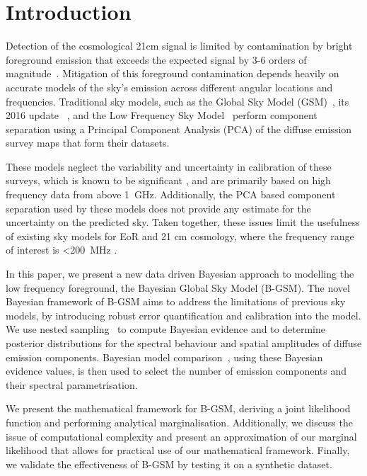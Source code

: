 \documentclass[fleqn,usenatbib]{mnras}
\begin{document}


\section{Introduction}
Detection of the cosmological 21cm signal is limited by contamination by bright foreground emission that exceeds the expected signal by 3-6 orders of magnitude~\citep{Pritchard2012,LFSM}. Mitigation of this foreground contamination depends heavily on accurate models of the sky's emission across different angular locations and frequencies. Traditional sky models, such as the Global Sky Model (GSM)~\citep{GSM}, its 2016 update ~\citep{Zheng2016}, and the Low Frequency Sky Model~\citep{LFSM} perform component separation using a Principal Component Analysis (PCA) of the diffuse emission survey maps that form their datasets. 

These models neglect the variability and uncertainty in calibration of these surveys, which is known to be significant \citep{Monsalve2021,Spinelli2021}, and are primarily based on high frequency data from above 1~GHz. Additionally, the PCA based component separation used by these models does not provide any estimate for the uncertainty on the predicted sky. Taken together, these issues limit the usefulness of existing sky models for EoR and 21 cm cosmology, where the frequency range of interest is <200~MHz \citep{Pritchard2012,Liu2013}.
 
In this paper, we present a new data driven Bayesian approach to modelling the low frequency foreground, the Bayesian Global Sky Model (B-GSM). The novel Bayesian framework of B-GSM aims to address the limitations of previous sky models, by introducing robust error quantification and calibration into the model. We use nested sampling~\citep{Skilling2004} to compute Bayesian evidence and to determine posterior distributions for the spectral behaviour and spatial amplitudes of diffuse emission components. Bayesian model comparison~\citep{Trotta2008}, using these Bayesian evidence values, is then used to select the number of emission components and their spectral parametrisation. 

We present the mathematical framework for B-GSM, deriving a joint likelihood function and performing analytical marginalisation. Additionally, we discuss the issue of computational complexity and present an approximation of our marginal likelihood that allows for practical use of our mathematical framework. Finally, we validate the effectiveness of B-GSM by testing it on a synthetic dataset.
\end{document}
